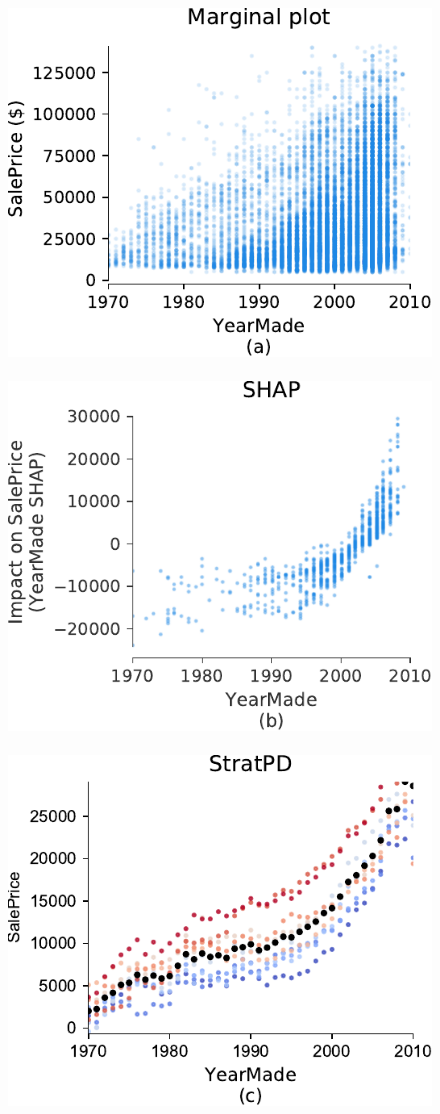 \documentclass[11pt]{article}
\begin{document}
\begin{figure}[htbp]
\begin{center}
\includegraphics[scale=0.5]{images/bulldozer-YearMade-marginal.pdf}~~
\includegraphics[scale=0.5]{images/bulldozer-YearMade-shap.pdf}~~
\includegraphics[scale=0.5]{images/bulldozer-YearMade-stratpd.pdf}

\end{center}
\end{figure}
\end{document}
